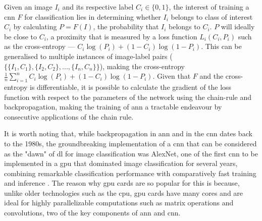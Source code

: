 Given an image $I_i$ and its respective label $C_i \in \{0,1\}$, the interest of training a \ac{cnn} $F$ for classification lies in determining whether $I_i$ belongs to class of interest $C_i$ by calculating $P = F(I)$, the probability that $I_i$ belongs to $C_i$. $P$ will ideally be close to $C_i$, a proximity that is measured by a loss function $L_i(C_i,P_i)$ such as the cross-entropy --- $C_i\log(P_i) + (1-C_i)\log(1-P_i)$. This can be generalised to multiple instances of image-label pairs ($\{\{I_1,C_1\},\{I_2,C_2\},...,\{I_n,C_n\}\}$), making the cross-entropy $\frac{1}{n}\sum_{i=1}^{n}C_i\log(P_i) + (1-C_i)\log(1-P_i)$. Given that $F$ and the cross-entropy is differentiable, it is possible to calculate the gradient of the loss function with respect to the parameters of the network using the chain-rule and backpropagation, making the training of \ac{ann} a tractable endeavour by consecutive applications of the chain rule. 

It is worth noting that, while backpropagation in \ac{ann} and in the \ac{cnn} dates back to the 1980s, the groundbreaking implementation of a \ac{cnn} that can be considered as the "dawn" of \ac{dl} for image classification was AlexNet, one of the first \ac{cnn} to be implemented in a \ac{gpu} that dominated image classification for several years, combining remarkable classification performance with comparatively fast training and inference \cite{Krizhevsky2012-by}. The reason why \ac{gpu} cards are so popular for this is because, unlike older technologies such as the \ac{cpu}, \ac{gpu} cards have many cores and are ideal for highly parallelizable computations such as matrix operations and convolutions, two of the key components of \ac{ann} and \ac{cnn}.

